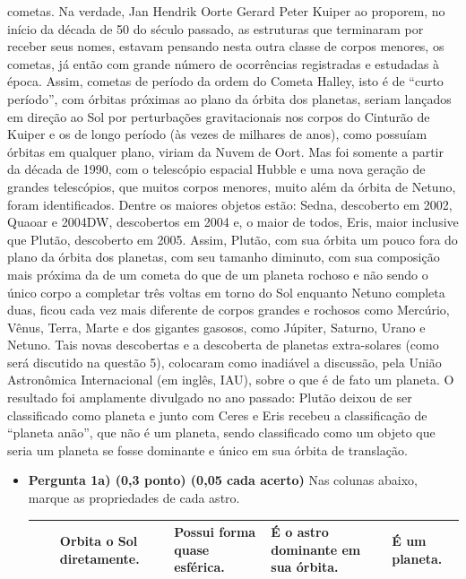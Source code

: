 \documentclass[a4paper, 12pt]{article}
\begin{document}
\begin{flushleft}
\begin{itemize}
cometas. Na verdade, Jan Hendrik Oorte Gerard Peter Kuiper ao proporem, no início da década de 50 do século passado, as estruturas que terminaram por receber seus nomes, estavam pensando nesta outra classe de corpos menores, os cometas, já então com grande número de ocorrências registradas e estudadas à época. Assim, cometas de período da ordem do Cometa Halley, isto é de ``curto período'', com órbitas próximas ao plano da órbita dos planetas, seriam lançados em direção ao Sol por perturbações gravitacionais nos corpos do Cinturão de Kuiper e os de longo período (às vezes de milhares de anos), como possuíam órbitas em qualquer plano, viriam da Nuvem de Oort. Mas foi somente a partir da década de 1990, com o telescópio espacial Hubble e uma nova geração de grandes telescópios, que muitos corpos menores, muito além da órbita de Netuno, foram identificados. Dentre os maiores objetos estão: Sedna, descoberto em 2002, Quaoar e 2004DW, descobertos em 2004 e, o maior de todos, Eris, maior inclusive que Plutão, descoberto em 2005. Assim, Plutão, com sua órbita um pouco fora do plano da órbita dos planetas, com seu tamanho diminuto, com sua composição mais próxima da de um cometa do que de um planeta rochoso e não sendo o único corpo a completar três voltas em torno do Sol enquanto Netuno completa duas, ficou cada vez mais diferente de corpos grandes e rochosos como Mercúrio, Vênus, Terra, Marte e dos gigantes gasosos, como Júpiter, Saturno, Urano e Netuno. Tais novas descobertas e a descoberta de planetas extra-solares (como será discutido na questão 5), colocaram como inadiável a discussão, pela União Astronômica Internacional (em inglês, IAU), sobre o que é de fato um planeta. O resultado foi amplamente divulgado no ano passado: Plutão deixou de ser classificado como planeta e junto com Ceres e Eris recebeu a classificação de ``planeta anão'', que não é um planeta, sendo classificado como um objeto que seria um planeta se fosse dominante e único em sua órbita de translação.
                \begin{itemize}
                    \item \textbf{Pergunta 1a) (0,3 ponto) (0,05 cada acerto)} Nas colunas abaixo, marque as propriedades de cada astro.
                        \begin{center} \begin{tabular}
                        {
                            |M{0.15\textwidth}|M{0.15\textwidth}|M{0.15\textwidth}|M{0.15\textwidth}|M{0.15\textwidth}|
                        }
                            \hline
                            $\quad$ & Orbita o Sol diretamente. & Possui forma quase esférica. & É o astro dominante em sua órbita. & É um planeta. \\ \hline

\end{tabular}
\end{center}
\end{itemize}
\end{itemize}
\end{flushleft}
\end{document}
